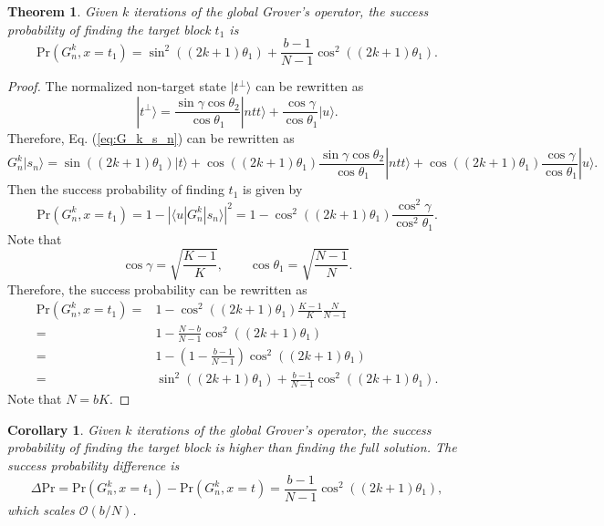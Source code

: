 \documentclass[a4paper,10pt]{article}
\newcommand{\pr}{\mathrm{Pr}}
\newtheorem{theorem}{Theorem}
\newtheorem{corollary}{Corollary}[theorem]
\numberwithin{equation}{section}
\begin{document}
\begin{theorem}
    Given $k$ iterations of the global Grover's operator, the success probability of finding the target block $t_1$ is
    \begin{equation}
        \pr\left(G_n^k,x=t_1\right) = \sin^2((2k+1)\theta_1)+\frac{b-1}{N-1}\cos^2((2k+1)\theta_1).
    \end{equation}
\end{theorem}
\begin{proof}
    The normalized non-target state $|t^\perp\rangle$ can be rewritten as
    \begin{equation}
        |t^\perp\rangle = \frac{\sin\gamma\cos\theta_2}{\cos\theta_1}|ntt\rangle + \frac{\cos\gamma}{\cos\theta_1}|u\rangle.
    \end{equation}
    Therefore, Eq. (\ref{eq:G_k_s_n}) can be rewritten as
    \begin{equation}
        G_n^k|s_n\rangle = \sin((2k+1)\theta_1)|t\rangle + \cos((2k+1)\theta_1)\frac{\sin\gamma\cos\theta_2}{\cos\theta_1}|ntt\rangle + \cos((2k+1)\theta_1)\frac{\cos\gamma}{\cos\theta_1}|u\rangle.
    \end{equation}
    Then the success probability of finding $t_1$ is given by
    \begin{equation}
        \pr\left(G_n^k,x=t_1\right) = 1- \left|\langle u|G_n^k|s_n\rangle\right|^2 = 1 -  \cos^2((2k+1)\theta_1)\frac{\cos^2\gamma}{\cos^2\theta_1}.
    \end{equation}
    Note that
    \begin{equation}
        \cos\gamma = \sqrt{\frac{K-1}{K}},\qquad \cos\theta_1 = \sqrt{\frac{N-1}{N}}.
    \end{equation}
    Therefore, the success probability can be rewritten as
    \begin{align}
        \pr\left(G_n^k,x=t_1\right) = & 1 - \cos^2((2k+1)\theta_1)\frac{K-1}{K}\frac{N}{N-1} \nonumber \\
        = & 1 - \frac{N-b}{N-1}\cos^2((2k+1)\theta_1) \nonumber \\
        = & 1 - \left(1-\frac{b-1}{N-1}\right)\cos^2((2k+1)\theta_1) \nonumber \\
        = & \sin^2((2k+1)\theta_1) + \frac{b-1}{N-1}\cos^2((2k+1)\theta_1).
    \end{align}
    Note that $N=bK$.
\end{proof}

\begin{corollary}
Given $k$ iterations of the global Grover's operator, the success probability of finding the target block is higher than finding the full solution. The success probability difference is
\begin{equation}
    \Delta\pr = \pr\left(G_n^k,x=t_1\right) - \pr\left(G_n^k,x=t\right) = \frac{b-1}{N-1}\cos^2((2k+1)\theta_1),
\end{equation}
which scales $\mathcal O(b/N)$.
\end{corollary}
\end{document}
